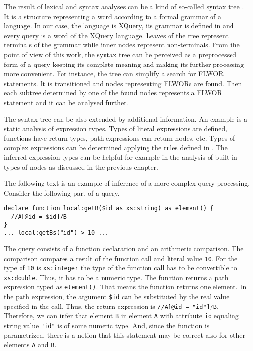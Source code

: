 The result of lexical and syntax analyses can be a kind of so-called syntax tree \cite{compilers}. It is a structure representing a word according to a formal grammar of a language. In our case, the language is XQuery, its grammar is defined in \cite{w3c_xquery} and every query is a word of the XQuery language. Leaves of the tree represent terminals of the grammar while inner nodes represent non-terminals. From the point of view of this work, the syntax tree can be perceived as a preprocessed form of a query keeping its complete meaning and making its further processing more convenient. For instance, the tree can simplify a search for FLWOR statements. It is transitioned and nodes representing FLWORs are found. Then each subtree determined by one of the found nodes represents a FLWOR statement and it can be analysed further.

The syntax tree can be also extended by additional information. An example is a static analysis of expression types. Types of literal expressions are defined, functions have return types, path expressions can return nodes, etc. Types of complex expressions can be determined applying the rules defined in \cite{w3c_xquery}. The inferred expression types can be helpful for example in the analysis of built-in types of nodes as discussed in the previous chapter. 

The following text is an example of inference of a more complex query processing. Consider the following part of a query.
\begin{verbatim}
declare function local:getB($id as xs:string) as element() {
  //A[@id = $id]/B
}
... local:getBs("id") > 10 ...
\end{verbatim}
The query consists of a function declaration and an arithmetic comparison. The comparison compares a result of the function call and literal value \texttt{10}. For the type of \texttt{10} is \texttt{xs:integer} the type of the function call has to be convertible to \texttt{xs:double}. Thus, it has to be a numeric type. The function returns a path expression typed as \texttt{element()}. That means the function returns one element. In the path expression, the argument \texttt{\$id} can be substituted by the real value specified in the call. Thus, the return expression is \texttt{//A[@id = "id"]/B}. Therefore, we can infer that element \texttt{B} in element \texttt{A} with attribute \texttt{id} equaling string value \texttt{"id"} is of some numeric type. And, since the function is parametrized, there is a notion that this statement may be correct also for other elements \texttt{A} and \texttt{B}.

